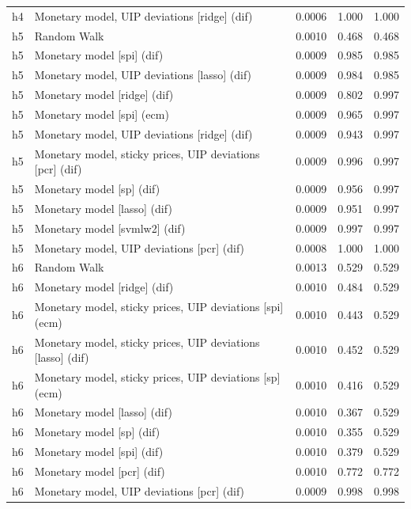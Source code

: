 \begin{ThreePartTable}
\begin{longtable}[t]{cp{5.5cm}ccc}
h4 & \raggedright Monetary model, UIP deviations [ridge] (dif) & 0.0006 & 1.000 & 1.000\\
\addlinespace
h5 & \raggedright Random Walk & 0.0010 & 0.468 & 0.468\\
h5 & \raggedright Monetary model [spi] (dif) & 0.0009 & 0.985 & 0.985\\
h5 & \raggedright Monetary model, UIP deviations [lasso] (dif) & 0.0009 & 0.984 & 0.985\\
h5 & \raggedright Monetary model [ridge] (dif) & 0.0009 & 0.802 & 0.997\\
h5 & \raggedright Monetary model [spi] (ecm) & 0.0009 & 0.965 & 0.997\\
h5 & \raggedright Monetary model, UIP deviations [ridge] (dif) & 0.0009 & 0.943 & 0.997\\
h5 & \raggedright Monetary model, sticky prices, UIP deviations [pcr] (dif) & 0.0009 & 0.996 & 0.997\\
h5 & \raggedright Monetary model [sp] (dif) & 0.0009 & 0.956 & 0.997\\
h5 & \raggedright Monetary model [lasso] (dif) & 0.0009 & 0.951 & 0.997\\
h5 & \raggedright Monetary model [svmlw2] (dif) & 0.0009 & 0.997 & 0.997\\
h5 & \raggedright Monetary model, UIP deviations [pcr] (dif) & 0.0008 & 1.000 & 1.000\\
\addlinespace
h6 & \raggedright Random Walk & 0.0013 & 0.529 & 0.529\\
h6 & \raggedright Monetary model [ridge] (dif) & 0.0010 & 0.484 & 0.529\\
h6 & \raggedright Monetary model, sticky prices, UIP deviations [spi] (ecm) & 0.0010 & 0.443 & 0.529\\
h6 & \raggedright Monetary model, sticky prices, UIP deviations [lasso] (dif) & 0.0010 & 0.452 & 0.529\\
h6 & \raggedright Monetary model, sticky prices, UIP deviations [sp] (ecm) & 0.0010 & 0.416 & 0.529\\
h6 & \raggedright Monetary model [lasso] (dif) & 0.0010 & 0.367 & 0.529\\
h6 & \raggedright Monetary model [sp] (dif) & 0.0010 & 0.355 & 0.529\\
h6 & \raggedright Monetary model [spi] (dif) & 0.0010 & 0.379 & 0.529\\
h6 & \raggedright Monetary model [pcr] (dif) & 0.0010 & 0.772 & 0.772\\
h6 & \raggedright Monetary model, UIP deviations [pcr] (dif) & 0.0009 & 0.998 & 0.998\\

\end{longtable}
\end{ThreePartTable}
